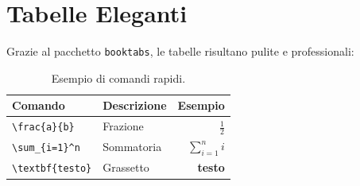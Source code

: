 \documentclass[11pt,a4paper]{article}
\begin{document}
\section{Tabelle Eleganti}
Grazie al pacchetto \texttt{booktabs}, le tabelle risultano pulite e professionali:

\begin{table}[htbp]
\centering
\begin{tabular}{llr}
\toprule
\textbf{Comando} & \textbf{Descrizione} & \textbf{Esempio} \\
\midrule
\texttt{\textbackslash frac\{a\}\{b\}} & Frazione & $\frac{1}{2}$ \\
\texttt{\textbackslash sum\_\{i=1\}\^{}n} & Sommatoria & $\sum_{i=1}^n i$ \\
\texttt{\textbackslash textbf\{testo\}} & Grassetto & \textbf{testo} \\
\bottomrule
\end{tabular}
\caption{Esempio di comandi rapidi.}
\label{tab:comandi}
\end{table}
\end{document}
